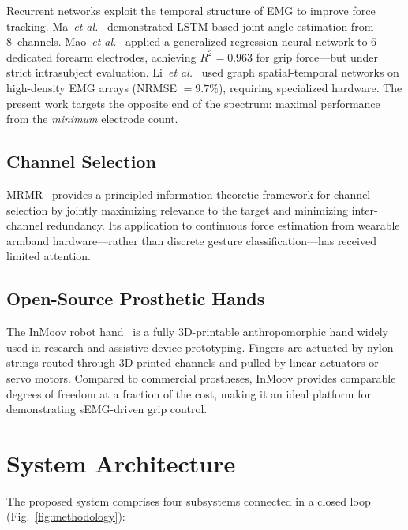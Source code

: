 \documentclass[journal]{IEEEtran}
\begin{document}
Recurrent networks exploit the temporal structure of EMG to improve force
tracking.  Ma~\emph{et al.}~\cite{ma2021continuous} demonstrated LSTM-based
joint angle estimation from 8~channels.
Mao~\emph{et al.}~\cite{mao2023continuous} applied a generalized regression
neural network to 6 dedicated forearm electrodes, achieving $R^2 = 0.963$
for grip force---but under strict intrasubject evaluation.
Li~\emph{et al.}~\cite{li2024graph} used graph spatial-temporal networks on
high-density EMG arrays (NRMSE $= 9.7\%$), requiring specialized hardware.
The present work targets the opposite end of the spectrum: maximal
performance from the \emph{minimum} electrode count.

\subsection{Channel Selection}

MRMR~\cite{peng2005feature} provides a principled information-theoretic
framework for channel selection by jointly maximizing relevance to the
target and minimizing inter-channel redundancy.  Its application to
continuous force estimation from wearable armband hardware---rather than
discrete gesture classification---has received limited attention.

\subsection{Open-Source Prosthetic Hands}

The InMoov robot hand~\cite{langevin2017inmoov} is a fully 3D-printable
anthropomorphic hand widely used in research and assistive-device
prototyping.  Fingers are actuated by nylon strings routed through 3D-printed
channels and pulled by linear actuators or servo motors.  Compared to
commercial prostheses, InMoov provides comparable degrees of freedom at a
fraction of the cost, making it an ideal platform for demonstrating
sEMG-driven grip control.

\section{System Architecture}
\label{sec:system}

The proposed system comprises four subsystems connected in a closed loop
(Fig.~\ref{fig:methodology}):
\end{document}
